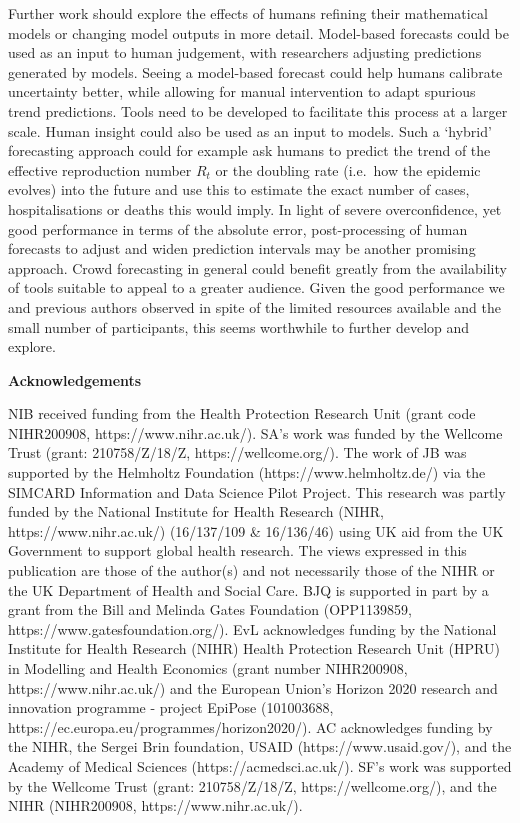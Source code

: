 \documentclass[10pt,letterpaper]{article}
\begin{document}
Further work should explore the effects of humans refining their
mathematical models or changing model outputs in more detail.
Model-based forecasts could be used as an input to human judgement, with
researchers adjusting predictions generated by models. Seeing a
model-based forecast could help humans calibrate uncertainty better,
while allowing for manual intervention to adapt spurious trend
predictions. Tools need to be developed to facilitate this process at a
larger scale. Human insight could also be used as an input to models.
Such a `hybrid' forecasting approach could for example ask humans to
predict the trend of the effective reproduction number \(R_t\) or the
doubling rate (i.e.~how the epidemic evolves) into the future and use
this to estimate the exact number of cases, hospitalisations or deaths
this would imply. In light of severe overconfidence, yet good
performance in terms of the absolute error, post-processing of human
forecasts to adjust and widen prediction intervals may be another
promising approach. Crowd forecasting in general could benefit greatly
from the availability of tools suitable to appeal to a greater audience.
Given the good performance we and previous authors observed in spite of
the limited resources available and the small number of participants,
this seems worthwhile to further develop and explore.

\clearpage

\textbf{Acknowledgements}

NIB received funding from the Health Protection Research Unit (grant
code NIHR200908, https://www.nihr.ac.uk/). SA's work was funded by the
Wellcome Trust (grant: 210758/Z/18/Z, https://wellcome.org/). The work
of JB was supported by the Helmholtz Foundation
(https://www.helmholtz.de/) via the SIMCARD Information and Data Science
Pilot Project. This research was partly funded by the National Institute
for Health Research (NIHR, https://www.nihr.ac.uk/) (16/137/109 \&
16/136/46) using UK aid from the UK Government to support global health
research. The views expressed in this publication are those of the
author(s) and not necessarily those of the NIHR or the UK Department of
Health and Social Care. BJQ is supported in part by a grant from the
Bill and Melinda Gates Foundation (OPP1139859,
https://www.gatesfoundation.org/). EvL acknowledges funding by the
National Institute for Health Research (NIHR) Health Protection Research
Unit (HPRU) in Modelling and Health Economics (grant number NIHR200908,
https://www.nihr.ac.uk/) and the European Union's Horizon 2020 research
and innovation programme - project EpiPose (101003688,
https://ec.europa.eu/programmes/horizon2020/). AC acknowledges funding
by the NIHR, the Sergei Brin foundation, USAID (https://www.usaid.gov/),
and the Academy of Medical Sciences (https://acmedsci.ac.uk/). SF's work
was supported by the Wellcome Trust (grant: 210758/Z/18/Z,
https://wellcome.org/), and the NIHR (NIHR200908,
https://www.nihr.ac.uk/).
\end{document}
